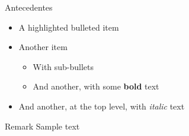 \begin{frame}{\color{blue}Antecedentes}

  \begin{itemize}
    \item A \alert{highlighted} bulleted item
      \pause
    \item Another item
      \begin{itemize}
        \item With sub-bullets
        \item And another, with some \textbf{bold} text
      \end{itemize}
    \item And another, at the top level, with \textit{italic} text
  \end{itemize}

  \begin{block}{Remark}
    Sample text
  \end{block}
  

\end{frame}
